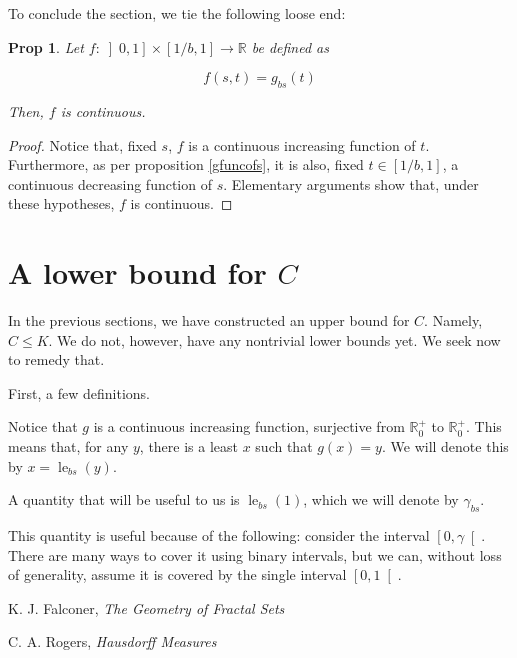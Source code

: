\documentclass[11pt]{amsart}
\newcommand{\R}{\mathbb{R}}
\newtheorem{prop}{Prop}
\DeclareMathOperator{\len}{le}
\begin{document}
To conclude the section, we tie the following loose end:

\begin{prop}
Let $f : \left]0, 1\right] \times \left[1/b, 1\right] \to \R$ be defined as

\[f(s, t) = g_{bs}(t)\]

Then, $f$ is continuous.
\end{prop}

\begin{proof}
Notice that, fixed $s$, $f$ is a continuous increasing function of $t$. Furthermore, as per proposition \ref{gfuncofs}, it is also, fixed $t \in \left[1/b, 1 \right]$, a continuous decreasing function of $s$. Elementary arguments show that, under these hypotheses, $f$ is continuous. %
\end{proof}

\section{A lower bound for $C$}

In the previous sections, we have constructed an upper bound for $C$. Namely, $C \leq K$. We do not, however, have any nontrivial lower bounds yet. We seek now to remedy that.

First, a few definitions.

Notice that $g$ is a continuous increasing function, surjective from $\R^+_0$ to $\R^+_0$. This means that, for any $y$, there is a least $x$ such that $g(x) = y$. We will denote this by $x = \len_{bs}(y)$.

A quantity that will be useful to us is $\len_{bs}(1)$, which we will denote by $\gamma_{bs}$.

This quantity is useful because of the following: consider the interval $\left[0, \gamma \right[$. There are many ways to cover it using binary intervals, but we can, without loss of generality, assume it is covered by the single interval $\left[0, 1 \right[$.


\begin{thebibliography}{1}
K. J. Falconer, \textit{The Geometry of Fractal Sets}

C. A. Rogers, \textit{Hausdorff Measures}

\end{thebibliography}
\end{document}
